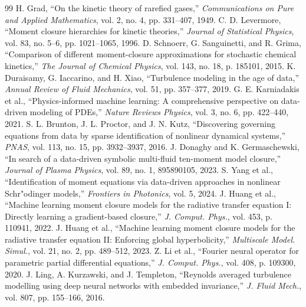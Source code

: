 \documentclass[journal, onecolumn]{IEEEtran}
\begin{document}
\begin{thebibliography}{99}
 H. Grad, ``On the kinetic theory of rarefied gases,'' \emph{Communications on Pure and Applied Mathematics}, vol. 2, no. 4, pp. 331--407, 1949.
 C. D. Levermore, ``Moment closure hierarchies for kinetic theories,'' \emph{Journal of Statistical Physics}, vol. 83, no. 5--6, pp. 1021--1065, 1996.
 D. Schnoerr, G. Sanguinetti, and R. Grima, ``Comparison of different moment-closure approximations for stochastic chemical kinetics,'' \emph{The Journal of Chemical Physics}, vol. 143, no. 18, p. 185101, 2015.
 K. Duraisamy, G. Iaccarino, and H. Xiao, ``Turbulence modeling in the age of data,'' \emph{Annual Review of Fluid Mechanics}, vol. 51, pp. 357--377, 2019.
 G. E. Karniadakis et al., ``Physics-informed machine learning: A comprehensive perspective on data-driven modeling of PDEs,'' \emph{Nature Reviews Physics}, vol. 3, no. 6, pp. 422--440, 2021.
 S. L. Brunton, J. L. Proctor, and J. N. Kutz, ``Discovering governing equations from data by sparse identification of nonlinear dynamical systems,'' \emph{PNAS}, vol. 113, no. 15, pp. 3932--3937, 2016.
 J. Donaghy and K. Germaschewski, ``In search of a data-driven symbolic multi-fluid ten-moment model closure,'' \emph{Journal of Plasma Physics}, vol. 89, no. 1, 895890105, 2023.
 S. Yang et al., ``Identification of moment equations via data-driven approaches in nonlinear Schr"odinger models,'' \emph{Frontiers in Photonics}, vol. 5, 2024.
 J. Huang et al., ``Machine learning moment closure models for the radiative transfer equation I: Directly learning a gradient-based closure,'' \emph{J. Comput. Phys.}, vol. 453, p. 110941, 2022.
 J. Huang et al., ``Machine learning moment closure models for the radiative transfer equation II: Enforcing global hyperbolicity,'' \emph{Multiscale Model. Simul.}, vol. 21, no. 2, pp. 489--512, 2023.
 Z. Li et al., ``Fourier neural operator for parametric partial differential equations,'' \emph{J. Comput. Phys.}, vol. 408, p. 109300, 2020.
 J. Ling, A. Kurzawski, and J. Templeton, ``Reynolds averaged turbulence modelling using deep neural networks with embedded invariance,'' \emph{J. Fluid Mech.}, vol. 807, pp. 155--166, 2016.
\end{thebibliography}
\end{document}

